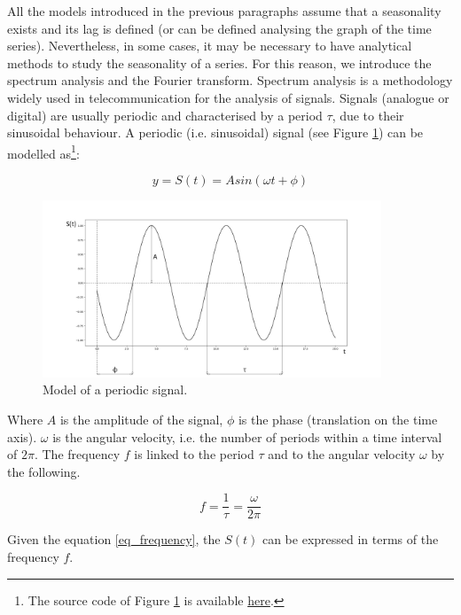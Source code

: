 All the models introduced in the previous paragraphs assume that a seasonality exists and its lag is defined (or can be defined analysing the graph of the time series). Nevertheless, in some cases, it may be necessary to have analytical methods to study the seasonality of a series. For this reason, we introduce the spectrum analysis and the Fourier transform. Spectrum analysis is a methodology widely used in telecommunication for the analysis of signals. Signals (analogue or digital) are usually periodic and characterised by a period $\tau$, due to their sinusoidal behaviour. A periodic (i.e. sinusoidal) signal (see Figure \ref{fig_signal}) can be modelled as\footnote{The source code of Figure \ref{fig_signal} is available \href{https://github.com/aletuf93/logproj/blob/master/examples/03.\%20Statistics.ipynb}{here}.}:

\begin{equation}
y=S(t)=Asin(\omega t+\phi)
\label{eq_signal}
\end{equation}


\begin{figure}[hbt!]
\centering
\includegraphics[width=0.9\textwidth]{SectionLetsMath/elemStat_figures/fig_signal.png}
\captionsetup{type=figure}
\caption{Model of a periodic signal.}
\label{fig_signal}
\end{figure}

Where $A$ is the amplitude of the signal, $\phi$ is the phase (translation on the time axis). $\omega$ is the angular velocity, i.e. the number of periods within a time interval of $2\pi$. The frequency $f$ is linked to the period $\tau$ and to the angular velocity $\omega$ by the following.

\begin{equation}
f=\frac{1}{\tau}=\frac{\omega}{2\pi}
\label{eq_frequency}
\end{equation}

Given the equation \ref{eq_frequency}, the $S\left(t\right)$ can be expressed in terms of the frequency $f$.

